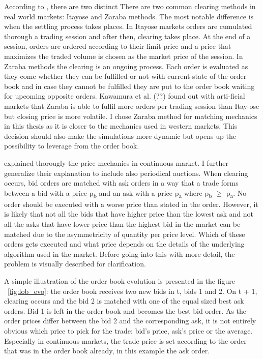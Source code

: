 According to , there are two distinct 
There are two common clearing methods in real world markets: 
Itayose and Zaraba methods. The most notable difference is 
when the settling process takes places. In Itayose markets 
orders are cumulated thorough a trading session and after 
then, clearing takes place. At the end of a session, orders 
are ordered according to their limit price and a price that 
maximizes the traded volume is chosen as the market price of 
the session. In Zaraba methods the clearing is an ongoing process. 
Each order is evaluated as they come whether they can be fulfilled 
or not with current state of the order book and in case they 
cannot be fulfilled they are put to the order book waiting 
for upcoming opposite orders. Kawamura et al. (??) found 
out with arti-ficial markets that Zaraba is able to fulfil 
more orders per trading session than Itay-ose but closing 
price is more volatile. I chose Zaraba method for matching 
mechanics in this thesis as it is closer to the mechanics 
used in western markets. This decision should also make 
the simulations more dynamic but opens up the possibility 
to leverage from the order book.






\citet{lob13} explained thorougly the price mechanics in continuous market. I 
further generalize their explanation to include also periodical auctions.
When clearing occurs, bid orders are matched with ask orders in a way that a 
trade forms between a bid with a price p\textsubscript{b} and an ask with a price 
p\textsubscript{a} where p\textsubscript{b} $\geq$ p\textsubscript{a}. No order
should be executed with a worse price than stated in the order. However, it is likely
that not all the bids that have higher price than the lowest ask and not all the asks that
have lower price than the highest bid in the market can be matched due to the asymmetricity 
of quantity per price level. Which of these orders gets executed and what price depends on 
the details of the underlying algorithm used in the market. Before going into this with more
detail, the problem is visually described for clarification.

A simple illustration of the order book evolution is presented
in the figure ~\ref{fig:lob_evo}: the order book receives two new bids in t, bids 1 and 2.
On t + 1, clearing occurs and the bid 2 is matched with one of the equal sized best ask orders.
Bid 1 is left in the order book and becomes the best bid order. As the order prices differ
between the bid 2 and the corresponding ask, it is not entirely obvious which price to pick
for the trade: bid's price, ask's price or the average. Especially in continuous markets,
the trade price is set according to the order that was in the order book already, in this
example the ask order. %

